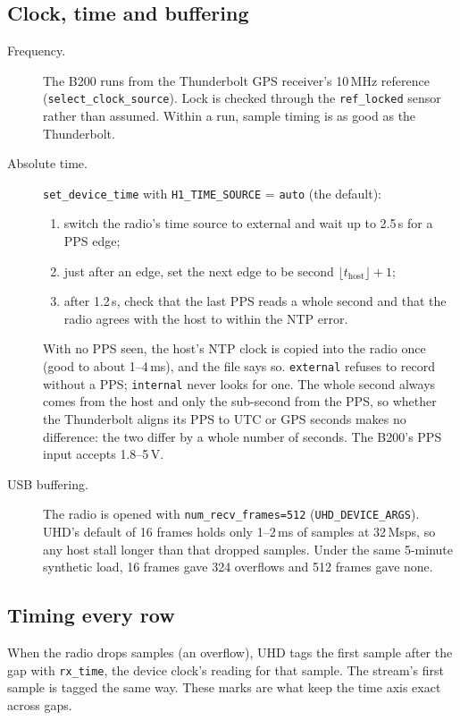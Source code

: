 \documentclass[11pt,a4paper]{article}
\newcommand{\code}[1]{\texttt{#1}}
\begin{document}
\subsection{Clock, time and buffering}
\begin{description}
\item[Frequency.] The B200 runs from the Thunderbolt GPS receiver's 10\,MHz reference (\code{select\_clock\_source}). Lock is checked through the \code{ref\_locked} sensor rather than assumed. Within a run, sample timing is as good as the Thunderbolt.
\item[Absolute time.] \code{set\_device\_time} with \code{H1\_TIME\_SOURCE} = \code{auto} (the default):
  \begin{enumerate}
  \item switch the radio's time source to external and wait up to 2.5\,s for a PPS edge;
  \item just after an edge, set the next edge to be second $\lfloor t_\mathrm{host}\rfloor+1$;
  \item after 1.2\,s, check that the last PPS reads a whole second and that the radio agrees with the host to within the NTP error.
  \end{enumerate}
  With no PPS seen, the host's NTP clock is copied into the radio once (good to about 1--4\,ms), and the file says so. \code{external} refuses to record without a PPS; \code{internal} never looks for one. The whole second always comes from the host and only the sub-second from the PPS, so whether the Thunderbolt aligns its PPS to UTC or GPS seconds makes no difference: the two differ by a whole number of seconds. The B200's PPS input accepts 1.8--5\,V.
\item[USB buffering.] The radio is opened with \code{num\_recv\_frames=512} (\code{UHD\_DEVICE\_ARGS}). UHD's default of 16 frames holds only 1--2\,ms of samples at 32\,Msps, so any host stall longer than that dropped samples. Under the same 5-minute synthetic load, 16 frames gave 324 overflows and 512 frames gave none.
\end{description}

\subsection{Timing every row}
When the radio drops samples (an overflow), UHD tags the first sample after the gap with \code{rx\_time}, the device clock's reading for that sample. The stream's first sample is tagged the same way. These marks are what keep the time axis exact across gaps.
\end{document}
